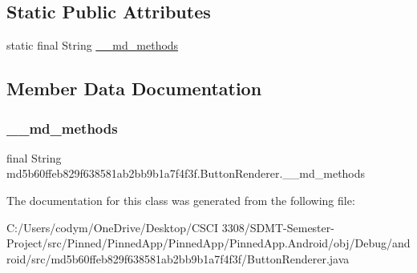 \subsection*{Static Public Attributes}
\begin{DoxyCompactItemize}
\item 
static final String \hyperlink{classmd5b60ffeb829f638581ab2bb9b1a7f4f3f_1_1_button_renderer_a9e989b257f85aa8a9f7b8ec7a324a423}{\+\_\+\+\_\+md\+\_\+methods}
\end{DoxyCompactItemize}


\subsection{Member Data Documentation}
\mbox{\label{classmd5b60ffeb829f638581ab2bb9b1a7f4f3f_1_1_button_renderer_a9e989b257f85aa8a9f7b8ec7a324a423}} 
\subsubsection{\texorpdfstring{\+\_\+\+\_\+md\+\_\+methods}{\_\_md\_methods}}
{\footnotesize\ttfamily final String md5b60ffeb829f638581ab2bb9b1a7f4f3f.\+Button\+Renderer.\+\_\+\+\_\+md\+\_\+methods\hspace{0.3cm}{\ttfamily [static]}}



The documentation for this class was generated from the following file\+:\begin{DoxyCompactItemize}
\item 
C\+:/\+Users/codym/\+One\+Drive/\+Desktop/\+C\+S\+C\+I 3308/\+S\+D\+M\+T-\/\+Semester-\/\+Project/src/\+Pinned/\+Pinned\+App/\+Pinned\+App/\+Pinned\+App.\+Android/obj/\+Debug/android/src/md5b60ffeb829f638581ab2bb9b1a7f4f3f/Button\+Renderer.\+java\end{DoxyCompactItemize}
